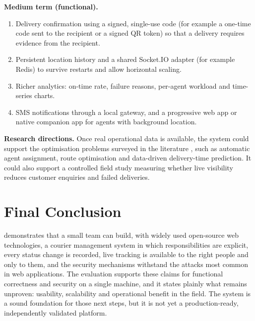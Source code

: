\textbf{Medium term (functional).}
\begin{enumerate}
  \item Delivery confirmation using a signed, single-use code (for example a one-time code sent to the recipient or a signed QR token) so that a delivery requires evidence from the recipient.
  \item Persistent location history and a shared Socket.IO adapter (for example Redis) to survive restarts and allow horizontal scaling.
  \item Richer analytics: on-time rate, failure reasons, per-agent workload and time-series charts.
  \item SMS notifications through a local gateway, and a progressive web app or native companion app for agents with background location.
\end{enumerate}

\textbf{Research directions.} Once real operational data is available, the system could support the optimisation problems surveyed in the literature \cite{boysen2021lastmile,savelsbergh2016city}, such as automatic agent assignment, route optimisation and data-driven delivery-time prediction. It could also support a controlled field study measuring whether live visibility reduces customer enquiries and failed deliveries.

\section{Final Conclusion}

\scpms{} demonstrates that a small team can build, with widely used open-source web technologies, a courier management system in which responsibilities are explicit, every status change is recorded, live tracking is available to the right people and only to them, and the security mechanisms withstand the attacks most common in web applications. The evaluation supports these claims for functional correctness and security on a single machine, and it states plainly what remains unproven: usability, scalability and operational benefit in the field. The system is a sound foundation for those next steps, but it is not yet a production-ready, independently validated platform.
